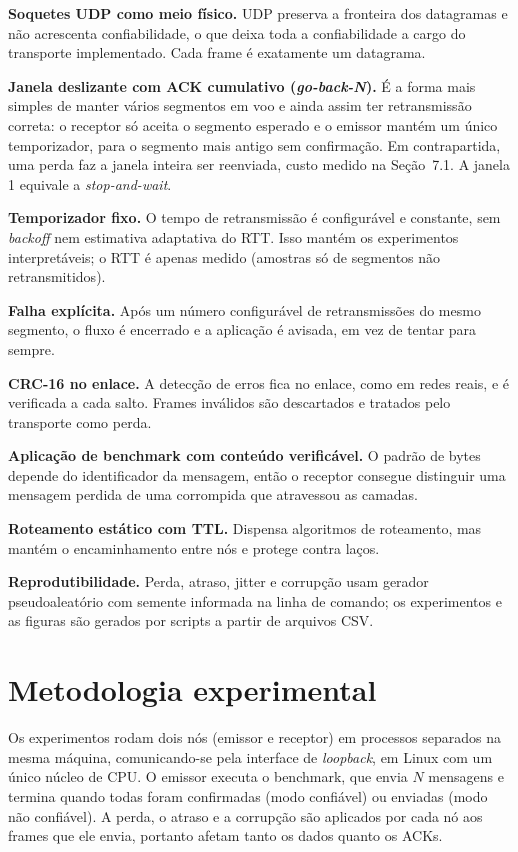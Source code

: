 \documentclass[11pt,a4paper]{article}
\begin{document}
\textbf{Soquetes UDP como meio f\'isico.} UDP preserva a fronteira dos datagramas e n\~ao acrescenta confiabilidade, o que deixa toda a confiabilidade a cargo do transporte implementado. Cada frame \'e exatamente um datagrama.

\textbf{Janela deslizante com ACK cumulativo (\emph{go-back-N}).} \'E a forma mais simples de manter v\'arios segmentos em voo e ainda assim ter retransmiss\~ao correta: o receptor s\'o aceita o segmento esperado e o emissor mant\'em um \'unico temporizador, para o segmento mais antigo sem confirma\c{c}\~ao. Em contrapartida, uma perda faz a janela inteira ser reenviada, custo medido na Se\c{c}\~ao~7.1. A janela 1 equivale a \emph{stop-and-wait}.

\textbf{Temporizador fixo.} O tempo de retransmiss\~ao \'e configur\'avel e constante, sem \emph{backoff} nem estimativa adaptativa do RTT. Isso mant\'em os experimentos interpret\'aveis; o RTT \'e apenas medido (amostras s\'o de segmentos n\~ao retransmitidos).

\textbf{Falha expl\'icita.} Ap\'os um n\'umero configur\'avel de retransmiss\~oes do mesmo segmento, o fluxo \'e encerrado e a aplica\c{c}\~ao \'e avisada, em vez de tentar para sempre.

\textbf{CRC-16 no enlace.} A detec\c{c}\~ao de erros fica no enlace, como em redes reais, e \'e verificada a cada salto. Frames inv\'alidos s\~ao descartados e tratados pelo transporte como perda.

\textbf{Aplica\c{c}\~ao de benchmark com conte\'udo verific\'avel.} O padr\~ao de bytes depende do identificador da mensagem, ent\~ao o receptor consegue distinguir uma mensagem perdida de uma corrompida que atravessou as camadas.

\textbf{Roteamento est\'atico com TTL.} Dispensa algoritmos de roteamento, mas mant\'em o encaminhamento entre n\'os e protege contra la\c{c}os.

\textbf{Reprodutibilidade.} Perda, atraso, jitter e corrup\c{c}\~ao usam gerador pseudoaleat\'orio com semente informada na linha de comando; os experimentos e as figuras s\~ao gerados por scripts a partir de arquivos CSV.

\section{Metodologia experimental}

Os experimentos rodam dois n\'os (emissor e receptor) em processos separados na mesma m\'aquina, comunicando-se pela interface de \emph{loopback}, em Linux com um \'unico n\'ucleo de CPU. O emissor executa o benchmark, que envia $N$ mensagens e termina quando todas foram confirmadas (modo confi\'avel) ou enviadas (modo n\~ao confi\'avel). A perda, o atraso e a corrup\c{c}\~ao s\~ao aplicados por cada n\'o aos frames que ele envia, portanto afetam tanto os dados quanto os ACKs.
\end{document}
